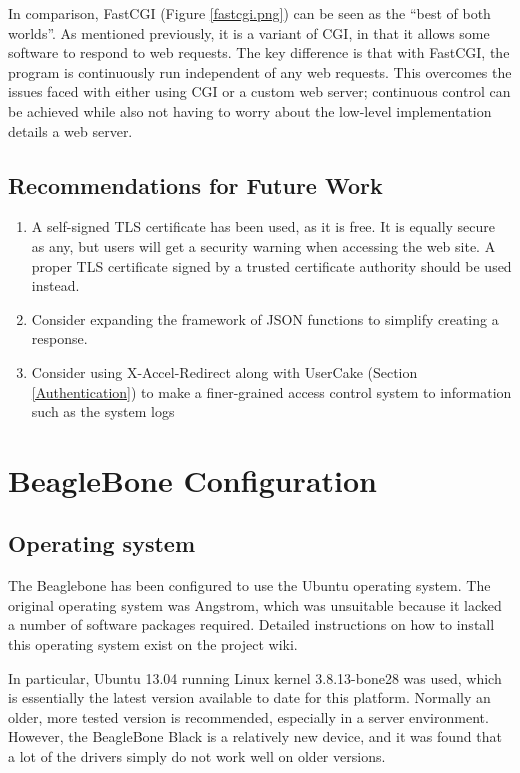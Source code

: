 In comparison, FastCGI (Figure \ref{fastcgi.png}) can be seen as the ``best of both worlds''. As mentioned previously, it is a variant of CGI, in that it allows some software to respond to web requests. The key difference is that with FastCGI, the program is continuously run independent of any web requests. This overcomes the issues faced with either using CGI or a custom web server; continuous control can be achieved while also not having to worry about the low-level implementation details a web server.



\subsection{Recommendations for Future Work}

\begin{enumerate}
	\item A self-signed TLS certificate has been used, as it is free. It is equally secure as any, but users will get a security warning when accessing the web site. A proper TLS certificate signed by a trusted certificate authority should be used instead.
	\item Consider expanding the framework of JSON functions to simplify creating a response. 
	\item Consider using X-Accel-Redirect along with UserCake (Section \ref{Authentication}) to make a finer-grained access control system to information such as the system logs
\end{enumerate}

\section{BeagleBone Configuration}\label{Configuration}

\subsection{Operating system}
The Beaglebone has been configured to use the Ubuntu operating system. The original operating system was Angstrom, which was unsuitable because it lacked a number of software packages required. Detailed instructions on how to install this operating system exist on the project wiki\cite{mctx3420_wiki}.

In particular, Ubuntu 13.04 running Linux kernel 3.8.13-bone28 was used, which is essentially the latest version available to date for this platform. Normally an older, more tested version is recommended, especially in a server environment. However, the BeagleBone Black is a relatively new device, and it was found that a lot of the drivers simply do not work well on older versions.

